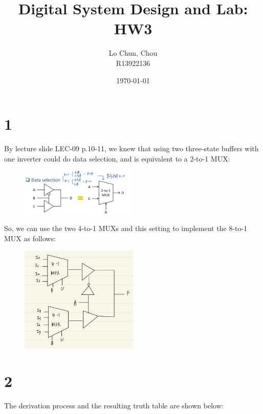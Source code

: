 \documentclass{article}
\title{Digital System Design and Lab: HW3}
\author{Lo Chun, Chou \\ R13922136}
\date\today
\begin{document}
\setlength{\parindent}{0pt}
\maketitle 

\section*{1}

By lecture slide LEC-09 p.10-11, 
we knew that using two three-state buffers with one inverter could do data selection, 
and is equivalent to a 2-to-1 MUX:

\begin{figure}[h]
    \centering
    \includegraphics[width=0.5\textwidth]{1_three_state_buffer_w_inverter.jpeg}
\end{figure}

So, we can use the two 4-to-1 MUXs and this setting to implement the 8-to-1 MUX as follows:

\begin{figure}[h]
    \centering
    \includegraphics[width=0.5\textwidth]{1_sol.jpeg}
\end{figure}

\section*{2}

The derivation process and the resulting truth table are shown below:
\end{document}
